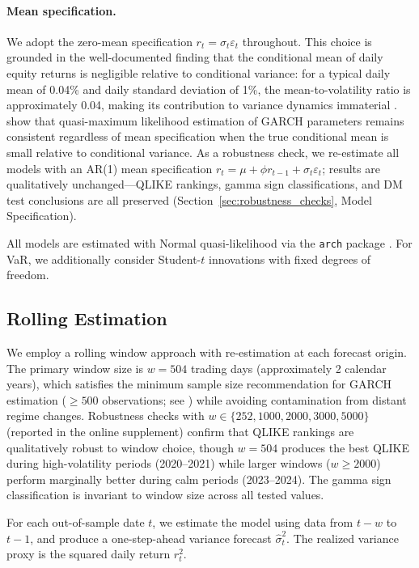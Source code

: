 \paragraph{Mean specification.}
We adopt the zero-mean specification $r_t = \sigma_t \varepsilon_t$ throughout. This choice is grounded in the well-documented finding that the conditional mean of daily equity returns is negligible relative to conditional variance: for a typical daily mean of 0.04\% and daily standard deviation of 1\%, the mean-to-volatility ratio is approximately 0.04, making its contribution to variance dynamics immaterial \citep{bollerslev1986,hansen2005}. \citet{francq2004} show that quasi-maximum likelihood estimation of GARCH parameters remains consistent regardless of mean specification when the true conditional mean is small relative to conditional variance. As a robustness check, we re-estimate all models with an AR(1) mean specification $r_t = \mu + \phi r_{t-1} + \sigma_t \varepsilon_t$; results are qualitatively unchanged---QLIKE rankings, gamma sign classifications, and DM test conclusions are all preserved (Section~\ref{sec:robustness_checks}, Model Specification).

All models are estimated with Normal quasi-likelihood via the \texttt{arch} package \citep{sheppard2023}. For VaR, we additionally consider Student-$t$ innovations with fixed degrees of freedom.

\subsection{Rolling Estimation}

We employ a rolling window approach with re-estimation at each forecast origin. The primary window size is $w = 504$ trading days (approximately 2 calendar years), which satisfies the minimum sample size recommendation for GARCH estimation ($\geq 500$ observations; see \citealt{hwang2006}) while avoiding contamination from distant regime changes. Robustness checks with $w \in \{252, 1000, 2000, 3000, 5000\}$ (reported in the online supplement) confirm that QLIKE rankings are qualitatively robust to window choice, though $w = 504$ produces the best QLIKE during high-volatility periods (2020--2021) while larger windows ($w \geq 2000$) perform marginally better during calm periods (2023--2024). The gamma sign classification is invariant to window size across all tested values.

For each out-of-sample date $t$, we estimate the model using data from $t-w$ to $t-1$, and produce a one-step-ahead variance forecast $\hat{\sigma}^2_t$. The realized variance proxy is the squared daily return $r^2_t$.

